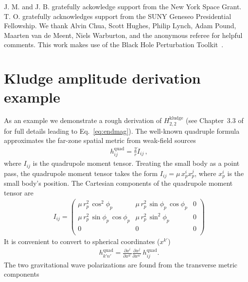 \documentclass[aps,prd,twocolumn,showpacs,notitlepage,eqsecnum,
superscriptaddress,nofootinbib]{revtex4-1}
\begin{document}
\acknowledgements

J. M. and J. B. gratefully ackowledge support from the New York Space Grant. T. O. gratefully acknowledges support from the SUNY Geneseo Presidential Fellowship. We thank Alvin Chua, Scott Hughes, Philip Lynch, Adam Pound, Maarten van de Meent, Niels Warburton, and the anonymous referee for helpful comments. This work makes use of the Black Hole Perturbation Toolkit~\cite{VandWarb18}.

\appendix

\section{Kludge amplitude derivation example}
\label{sec:kludge_app}

As an example we demonstrate a rough derivation of $H^\text{kludge}_{2,2}$ (see Chapter~3.3 of~\cite{maggiore} for full details leading to Eq.~\eqref{eq:endmag}). The well-known quadruple formula approximates the far-zone spatial metric from weak-field sources
\begin{align}
\label{eq:quadrupoleformula}
&h_{ij}^\text{quad}=\frac{2}{r}\ddot{I}_{ij} \, ,
\end{align}
where $I_{ij}$ is the quadrupole moment tensor. Treating the small body as a point pass, the quadrupole moment tensor takes the form $I_{ij}=\mu \, x^i_p x^j_p$, where $x^i_p$ is the small body's position. The Cartesian components of the quadrupole moment tensor are
\begin{align}
\label{eq:qmtValues}
&I_{ij}=
\left(
\begin{array}{ccc}
 \mu \, r_p^2 \, \cos ^2\phi_p & \mu \, r_p^2 \, \sin\phi_p \,\cos \phi_p & 0 \\
 \mu \, r_p^2 \, \sin\phi_p \, \cos\phi_p & \mu \, r_p^2 \, \sin^2\phi_p & 0 \\
 0 & 0 & 0 \\
\end{array}
\right)
\end{align}
It is convenient to convert to spherical coordinates ($x^{k'}$)
\begin{align}
\label{eq:convert}
&h^\text{quad}_{k'n'} = \frac{\partial x^i}{\partial x^{k'}}\frac{\partial x^j}{\partial x^{n'}}\, h^\text{quad}_{ij} .
\end{align}
The two gravitational wave polarizations are found from the transverse metric components
\end{document}
